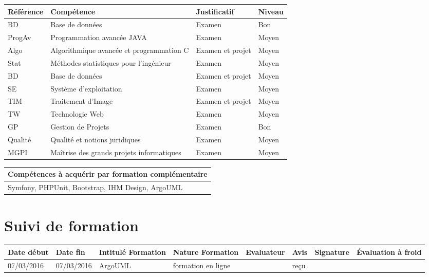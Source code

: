 \documentclass[11pt]{article}
\begin{document}
\centering
	\begin{longtable}{|p{3cm}|p{3cm}|p{3cm}|p{3cm}|}
	\hline
	\rowcolor{gray!40} Référence & Compétence & Justificatif & Niveau \\
	\hline
	 BD & Base de données & Examen & Bon \\
	 \hline
	 ProgAv & Programmation avancée JAVA & Examen & Moyen \\
	\hline
	Algo & Algorithmique avancée et programmation C & Examen et projet & Moyen \\
	\hline
	Stat & Méthodes statistiques pour l'ingénieur & Examen & Moyen \\
	\hline
	BD & Base de données & Examen et projet & Moyen \\
	\hline
	SE & Système d'exploitation & Examen & Moyen \\
	\hline
	TIM & Traitement d'Image & Examen et projet & Moyen \\
	\hline
	TW & Technologie Web & Examen & Moyen \\
	\hline
	GP & Gestion de Projets & Examen & Bon \\
    \hline
	Qualité & Qualité et notions juridiques & Examen & Moyen \\
	\hline
	MGPI & Maîtrise des grands projets informatiques & Examen & Moyen \\
	\hline
	\end{longtable}

\centering
	\begin{longtable}{|p{12cm}|}
	\hline
	\rowcolor{gray!40} Compétences à acquérir par formation complémentaire \\
	\hline
	Symfony, PHPUnit, Bootstrap, IHM Design, ArgoUML  \\
	\hline
	\end{longtable}

\section*{\large Suivi de formation}

\centering
	\begin{longtable}{|p{1.9cm}|p{1.9cm}|p{1.9cm}|p{1.9cm}|p{1cm}|p{1.5cm}|p{1.5cm}|p{1.5cm}|}
	\hline
	\rowcolor{gray!40} \tiny Date début & \tiny Date fin & \tiny Intitulé Formation & \tiny Nature Formation & \tiny Evaluateur & \tiny Avis & \tiny Signature & \tiny Évaluation à froid \\
	\hline
	07/03/2016 &07/03/2016 &ArgoUML &formation en ligne &\Julie &reçu \\
	\hline
	\end{longtable}
\end{document}
